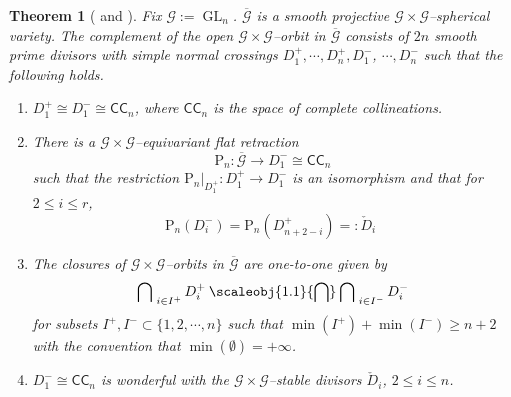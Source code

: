 \documentclass[10pt]{amsart}
\newtheorem{theorem}{Theorem}[section]
\theoremstyle{definition}
\newcommand{\CC}{\mathsf{CC}}   %
\newcommand{\GL}{\operatorname{GL}}
\newcommand{\PL}{\mathrm{P}}
\theoremstyle{plain} %
\begin{document}
\begin{theorem}[\cite{Ka} and \cite{FW}]\label{gwond}
Fix $\mathscr G:=\GL_n$.
$\overline{\mathscr G}$ is a smooth projective $\mathscr G\times \mathscr G$--spherical variety. The complement of the open
$\mathscr G\times \mathscr G$--orbit in $\overline{\mathscr G}$ consists of $2n$ smooth prime divisors with simple normal crossings $D^+_1, 
\cdots,D^+_n,D^-_1$, $\cdots,D^-_n$ such that the following holds.
\begin{enumerate}[label={\rm(\Alph*)}]
\item $D^+_1\cong D^-_1\cong\CC_n$, where $\CC_n$ is the space of complete collineations.

\item There is a $\mathscr G\times \mathscr G$--equivariant flat retraction 
\begin{equation*}
\PL_n:\overline{\mathscr G}\longrightarrow D_1^-\cong\CC_n  %
\end{equation*} such that the restriction  $\PL_n|_{D^+_1}:D_1^+\rightarrow D_1^-$ %
is an isomorphism and that for $2\leq i\leq r$,
\begin{equation}\PL_n(D^-_i)=\PL_n(D^+_{n+2-i})=:\check D_i\,\,    
\end{equation}

\item The closures of $\mathscr G\times \mathscr G$--orbits in $\overline{\mathscr G}$ are one-to-one given by
\begin{equation}\label{kinrule}
\bigcap\nolimits_{\,\,i\in I^+}D^+_i\mathbin{\scaleobj{1.1}{\bigcap}} \bigcap\nolimits_{\,\,i\in I^-}D^-_i%
\end{equation} 
for subsets $I^+,I^-\subset\{1,2,\cdots,n\}$
such that $\min(I^+)+\min(I^-)\geq n+2$ with the convention that $\min(\emptyset)=+\infty$.

\item  $D_1^-\cong\CC_n$ is wonderful with the $\mathscr G\times \mathscr G$--stable divisors $\check D_i$,  $2\leq i\leq n$.
\end{enumerate}
\end{theorem}
\end{document}
